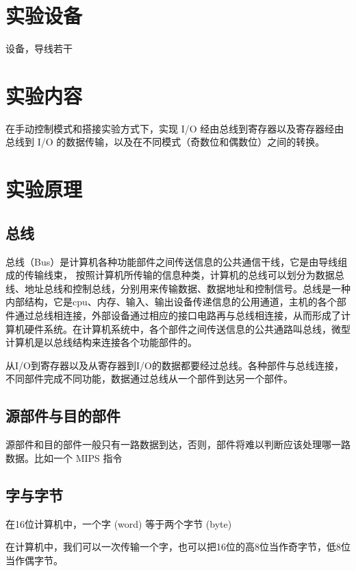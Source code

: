 \documentclass[a4paper,10pt,UTF8]{paper}
\numberwithin{equation}{section}
\numberwithin{figure}{section}
\begin{document}
\section{实验设备}

\dai 设备，导线若干

\section{实验内容}

在手动控制模式和搭接实验方式下，实现 I/O 经由总线到寄存器以及寄存器经由总线到 I/O 的数据传输，以及在不同模式（奇数位和偶数位）之间的转换。

\section{实验原理}

\subsection{总线}

总线（Bus）是计算机各种功能部件之间传送信息的公共通信干线，它是由导线组成的传输线束， 按照计算机所传输的信息种类，计算机的总线可以划分为数据总线、地址总线和控制总线，分别用来传输数据、数据地址和控制信号。总线是一种内部结构，它是cpu、内存、输入、输出设备传递信息的公用通道，主机的各个部件通过总线相连接，外部设备通过相应的接口电路再与总线相连接，从而形成了计算机硬件系统。在计算机系统中，各个部件之间传送信息的公共通路叫总线，微型计算机是以总线结构来连接各个功能部件的。

从I/O到寄存器以及从寄存器到I/O的数据都要经过总线。各种部件与总线连接，不同部件完成不同功能，数据通过总线从一个部件到达另一个部件。

\subsection{源部件与目的部件}

源部件和目的部件一般只有一路数据到达，否则，部件将难以判断应该处理哪一路数据。比如一个 MIPS 指令

\subsection{字与字节}

在16位计算机中，一个字 (word) 等于两个字节 (byte)

在\dai 计算机中，我们可以一次传输一个字，也可以把16位的高8位当作奇字节，低8位当作偶字节。
\end{document}
